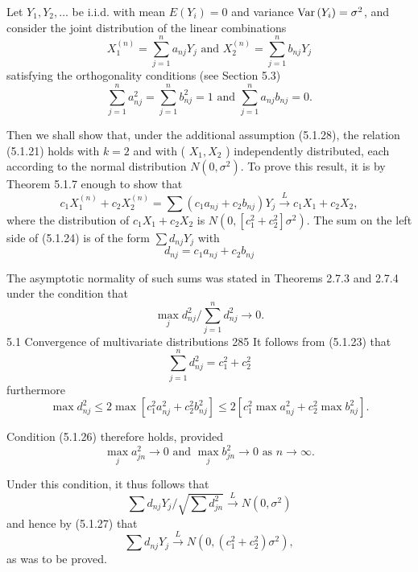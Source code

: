 \begin{example}
	Let $Y_1, Y_2, \ldots$ be i.i.d. with mean $E\left(Y_i\right)=0$ and variance $\mathrm{Var}\left(Y_i\right)=\sigma^2$, and consider the joint distribution of the linear combinations
	\begin{equation*}
		X_1^{(n)}=\sum_{j=1}^n a_{n j} Y_j \text { and } X_2^{(n)}=\sum_{j=1}^n b_{n j} Y_j
	\end{equation*}
	satisfying the orthogonality conditions (see Section 5.3)
	\begin{equation*}
		\sum_{j=1}^n a_{n j}^2=\sum_{j=1}^n b_{n j}^2=1 \text { and } \sum_{j=1}^n a_{n j} b_{n j}=0 .
	\end{equation*}

	Then we shall show that, under the additional assumption (5.1.28), the relation (5.1.21) holds with $k=2$ and with ( $X_1, X_2$ ) independently distributed, each according to the normal distribution $N\left(0, \sigma^2\right)$.
	To prove this result, it is by Theorem 5.1.7 enough to show that
	\begin{equation*}
		c_1 X_1^{(n)}+c_2 X_2^{(n)}=\sum\left(c_1 a_{n j}+c_2 b_{n j}\right) Y_j \xrightarrow{L} c_1 X_1+c_2 X_2,
	\end{equation*}
	where the distribution of $c_1 X_1+c_2 X_2$ is $N\left(0,\left[c_1^2+c_2^2\right] \sigma^2\right)$. The sum on the left side of (5.1.24) is of the form $\sum d_{n j} Y_j$ with
	\begin{equation*}
		d_{n j}=c_1 a_{n j}+c_2 b_{n j}
	\end{equation*}

	The asymptotic normality of such sums was stated in Theorems 2.7.3 and 2.7.4 under the condition that
	\begin{equation*}
		\max _j d_{n j}^2 / \sum_{j=1}^n d_{n j}^2 \rightarrow 0 .
	\end{equation*}
	5.1 Convergence of multivariate distributions
	285
	It follows from (5.1.23) that
	\begin{equation*}
		\sum_{j=1}^n d_{n j}^2=c_1^2+c_2^2
	\end{equation*}
	furthermore
	\begin{equation*}
		\max d_{n j}^2 \leq 2 \max \left[c_1^2 a_{n j}^2+c_2^2 b_{n j}^2\right] \leq 2\left[c_1^2 \max a_{n j}^2+c_2^2 \max b_{n j}^2\right] .
	\end{equation*}

	Condition (5.1.26) therefore holds, provided
	\begin{equation*}
		\max _j a_{j n}^2 \rightarrow 0 \text { and } \max _j b_{j n}^2 \rightarrow 0 \text { as } n \rightarrow \infty .
	\end{equation*}

	Under this condition, it thus follows that
	\begin{equation*}
		\sum d_{n j} Y_j / \sqrt{\sum d_{j n}^2} \xrightarrow{L} N\left(0, \sigma^2\right)
	\end{equation*}
	and hence by (5.1.27) that
	\begin{equation*}
		\sum d_{n j} Y_j \xrightarrow{L} N\left(0,\left(c_1^2+c_2^2\right) \sigma^2\right),
	\end{equation*}
	as was to be proved.
\end{example}
